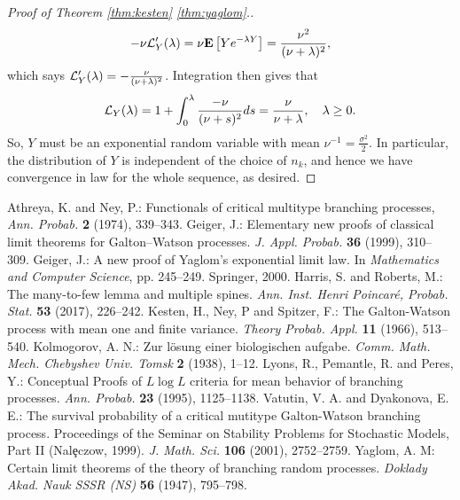 \documentclass[12pt]{amsart}
\numberwithin{equation}{section}
\newcommand{\brac}[1]{\left[ #1 \right]}
\newcommand{\expct}{\mathbf E}
\begin{document}
\begin{proof}[Proof of Theorem \ref{thm:kesten} \eqref{thm:yaglom}.]
\begin{equation*}
	    -\nu\cL_Y'(\lambda)
	=
	    \nu\expct\brac{Ye^{-\lambda Y}}
    =	
		\frac{\nu^2}{(\nu+\lambda)^2},
\end{equation*}
	which says $\mathcal L_Y'(\lambda)=-\frac{\nu}{(\nu+\lambda)^2}$.
	Integration then gives that
\begin{equation*}
	    \mathcal L_Y(\lambda)
	=
	    1
	+
	    \int_0^\lambda\frac{-\nu}{(\nu+s)^2}ds
	=
		\frac{\nu}{\nu+\lambda},
		\quad
		\lambda \ge 0.
	\end{equation*}
	So, $Y$ must be an 	exponential random variable
	with mean $\nu^{-1}=\frac{\sigma^2}{2}$.
	In particular, the distribution of $Y$
	is independent of the choice of $n_k$, and hence we have convergence in law for the whole sequence, as desired.
\end{proof}
\vspace{.1in}
\begin{thebibliography}{99}
 Athreya, K.  and  Ney, P.: Functionals of critical multitype branching processes, {\it Ann.
Probab.} {\bf 2} (1974), 339--343.
	Geiger, J.:
	Elementary new proofs of classical limit theorems for Galton--Watson processes.
	{\it J. Appl. Probab.} \textbf{36} (1999), 310--309.
	Geiger, J.:
	A new proof of Yaglom's exponential limit law.
	In {\it Mathematics and Computer Science}, pp. 245--249.
	Springer, 2000.
	Harris, S. and Roberts, M.:
	The many-to-few lemma and multiple spines.
	{\it Ann.  Inst. Henri Poincar{\'e}, Probab. Stat.}
	\textbf{53} (2017), 226--242.
	Kesten, H.,  Ney, P and Spitzer, F.:
	The Galton-Watson process with mean one and finite variance.
	{\it Theory Probab. Appl.}
	\textbf{11} (1966), 513--540.
	Kolmogorov, A. N.:
	Zur l{\"o}sung einer biologischen aufgabe.
	{\it Comm. Math. Mech. Chebyshev Univ. Tomsk}
	\textbf{2} (1938), 1--12.
	Lyons, R.,  Pemantle, R. and Peres, Y.:
	Conceptual Proofs of $ L \log L $ criteria for mean behavior of branching processes.
	{\it Ann. Probab.} \textbf{23} (1995), 1125--1138.
 Vatutin, V. A. and Dyakonova,  E. E.: The survival probability of a critical mutitype Galton-Watson branching process. Proceedings of the Seminar on Stability Problems for Stochastic Models, Part II (Nal\c{e}czow, 1999).
{\it J.  Math. Sci.} \textbf{106} (2001), 2752--2759.
	Yaglom, A. M:
	Certain limit theorems of the theory of branching random processes.
	{\it Doklady Akad. Nauk SSSR (NS)} \textbf{56} (1947), 795--798.
\end{thebibliography}
\end{document}
